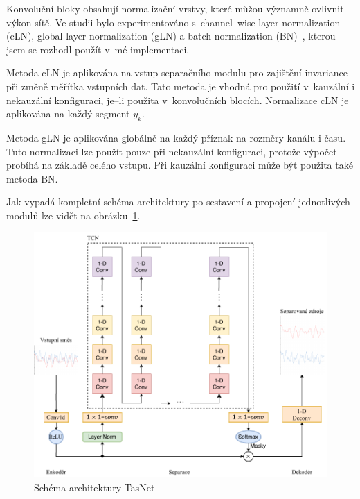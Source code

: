 Konvoluční bloky obsahují normalizační vrstvy, které můžou významně ovlivnit výkon sítě. Ve studii bylo experimentováno s~channel--wise layer normalization (cLN), global layer normalization (gLN) a batch normalization (BN)~\cite{ioffe2015batch}, kterou jsem se rozhodl použít v~mé implementaci.

Metoda cLN je aplikována na vstup separačního modulu pro zajištění invariance při změně měřítka vstupních dat. Tato metoda je vhodná pro použití v~kauzální i nekauzální konfiguraci, je--li použita v~konvolučních blocích. Normalizace cLN je aplikována na každý segment $y_k$. 

Metoda gLN je aplikována globálně na každý příznak na rozměry kanálu i času. Tuto normalizaci lze použít pouze při nekauzální konfiguraci, protože výpočet probíhá na základě celého vstupu.
Při kauzální konfiguraci může být použita také metoda BN.

\bigskip

Jak vypadá kompletní schéma architektury po sestavení a propojení jednotlivých modulů lze vidět na obrázku~\ref{fig:tasnet-modul}. 

\begin{figure}[H]
    \centering
    \includegraphics[scale=1.0]{obrazky-figures/tasnet-architecture.pdf}
    \caption{\label{fig:tasnet-modul}Schéma architektury TasNet}
\end{figure}





